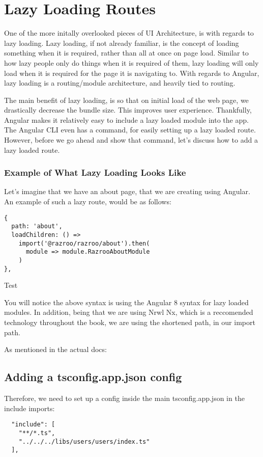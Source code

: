 
\chapter{ Lazy Loading Routes }
One of the more initally overlooked pieces of UI Architecture, is with regards to 
lazy loading. Lazy loading, if not already familiar, is the concept of loading
something when it is required, rather than all at once on page load. Similar to 
how lazy people only do things when it is required of them, lazy loading will 
only load when it is required for the page it is navigating to. With regards to Angular,
lazy loading is a routing/module architecture, and heavily tied to routing. 

The main benefit of lazy loading, is so that on initial load of the web page, we
drastically decrease the bundle size. This improves user experience. Thankfully, Angular 
makes it relatively easy to include a lazy loaded module into the app. The Angular CLI 
even has a command, for easily setting up a lazy loaded route. However, before we go 
ahead and show that command, let's discuss how to add a lazy loaded route. 

\subsection{Example of What Lazy Loading Looks Like}
Let's imagine that we have an about page, that we are creating using Angular.
An example of such a lazy route, would be as follows:
\begin{lstlisting}
{
  path: 'about',
  loadChildren: () =>
    import('@razroo/razroo/about').then(
      module => module.RazrooAboutModule
    )
},
\end{lstlisting}

Test

You will notice the above syntax is using the Angular 8 syntax for lazy loaded
modules. In addition, being that we are using Nrwl Nx, which is a reccomended 
technology throughout the book, we are using the shortened path, in our import 
path. 

As mentioned in the actual docs:

\section{Adding a tsconfig.app.json config}
Therefore, we need to set up a config inside the main tsconfig.app.json in the
include imports:
\begin{verbatim}
  "include": [
    "**/*.ts",
    "../../../libs/users/users/index.ts"
  ],
\end{verbatim}

